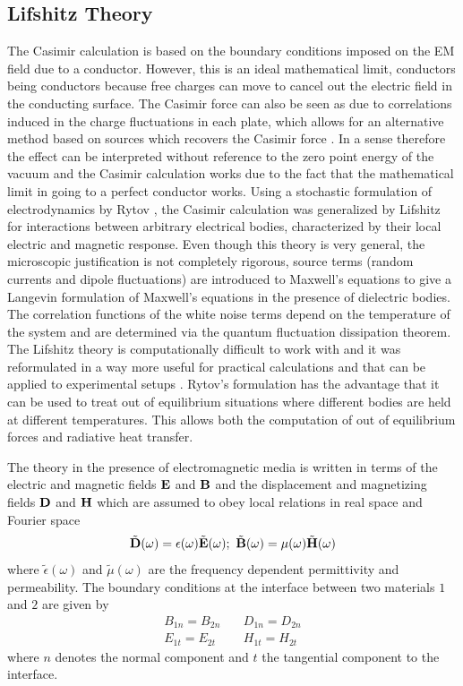 \subsection{Lifshitz Theory}
The Casimir calculation is based on the boundary conditions imposed on the EM field 
due to a conductor. However, this is an ideal mathematical limit, conductors being conductors because free charges can move to cancel out the electric field in the conducting surface.
The Casimir force can also be seen as due to correlations induced in the charge fluctuations in each plate, which allows for an alternative method based on sources which recovers the Casimir force \cite{julian_schwinger_casimir_1978,schwinger_casimir_1992}. In a sense therefore the effect can be interpreted without reference to the zero point energy of the vacuum and the Casimir calculation works due to the fact that the mathematical limit in going to a perfect conductor works. 
Using a stochastic formulation of electrodynamics by Rytov \cite{sm_rytov_principles_1989}, the Casimir calculation was generalized by Lifshitz for interactions between arbitrary electrical bodies, characterized by their local electric and magnetic response\cite{lifshits_theory_1955}. 
Even though this theory is very general, the microscopic justification is not completely rigorous, source terms (random currents and dipole fluctuations) are introduced to Maxwell's equations to give a Langevin formulation of Maxwell's equations in the presence of dielectric bodies. The correlation functions of the white noise terms depend on the temperature of the system and are determined via the quantum fluctuation dissipation theorem. The Lifshitz theory is computationally difficult to work with and it was reformulated in a way more useful for practical calculations and that can be applied to experimental setups \cite{van_kampen_macroscopic_1968,ninham_van_1970}.
Rytov's formulation has the advantage that it can be used to treat out of equilibrium situations where different bodies are held at different temperatures. This allows both the computation of out of equilibrium forces and radiative heat transfer. 

The theory in the presence of electromagnetic media is written in terms of the electric and magnetic fields ${\bf E}$ and ${\bf B}$ and the displacement and magnetizing fields ${\bf D}$ and ${\bf H}$ which are assumed to obey local relations in real space and Fourier space
\begin{equation}
\tilde {\bf D}(\omega)=\epsilon(\omega)\tilde{\bf E}(\omega); \ \tilde {\bf B}(\omega)= \mu(\omega) \tilde{\bf H}(\omega)
\end{equation}
where $\tilde\epsilon( \omega)$ and $\tilde\mu( \omega)$ are the frequency dependent
permittivity and permeability. The boundary conditions at the interface between two materials $1$ and $2$ are given by
\begin{eqnarray}
B_{1n}= B_{2n} && \ D_{1n}=D_{2n} \\
E_{1t} = E_{2t} && \ H_{1t}=H_{2t}
\end{eqnarray}
where $n$ denotes the normal component and $t$ the tangential component to the interface.

